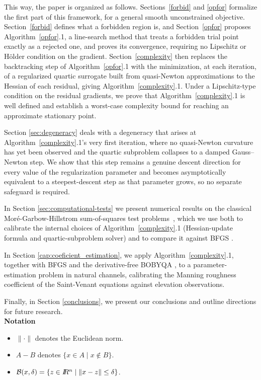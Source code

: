 \documentclass{article}
\newcommand{\R}         {I\!\!R}
\newcommand{\B}{{\cal B}}
\begin{document}
This way, the paper is organized as follows. Sections~\ref{forbid} and \ref{opfor} formalize the first part of this framework, for a general smooth unconstrained objective.
Section~\ref{forbid} defines what a forbidden region is, and Section~\ref{opfor} proposes Algorithm~\ref{opfor}.1, a line-search
method that treats a forbidden trial point exactly as a rejected one, and proves its convergence, requiring no Lipschitz or
H\"older condition on the gradient. Section~\ref{complexity} then replaces the backtracking step of Algorithm~\ref{opfor}.1 with
the minimization, at each iteration, of a regularized quartic surrogate built from quasi-Newton approximations to the Hessian of
each residual, giving Algorithm~\ref{complexity}.1. Under a Lipschitz-type condition on the residual gradients, we prove
that Algorithm~\ref{complexity}.1 is well defined and establish a worst-case complexity bound for reaching an approximate stationary point.

Section \ref{sec:degeneracy} deals with a degeneracy that arises at Algorithm~\ref{complexity}.1's very first iteration, where no quasi-Newton
 curvature has yet been observed and the quartic subproblem collapses to a damped Gauss--Newton step. We show that this step
remains a genuine descent direction for every value of the regularization parameter and becomes asymptotically equivalent to a
 steepest-descent step as that parameter grows, so no separate safeguard is required.

In Section \ref{sec:computational-tests} we present numerical results on the classical Mor\'e-Garbow-Hillstrom sum-of-squares
 test problems~\cite{MoreGarbowHillstrom1981}, which we use both to calibrate the internal choices of Algorithm~\ref{complexity}.1
 (Hessian-update formula and quartic-subproblem solver) and to compare it against BFGS \cite{NocedalWright2006, Powell1976}.

In Section \ref{cap:coeficient_estimation}, we apply Algorithm~\ref{complexity}.1, together with BFGS and the derivative-free BOBYQA \cite{bobyqa,rz}, to a
 parameter-estimation problem in natural channels, calibrating the Manning roughness coefficient of the Saint-Venant equations
 against elevation observations.

Finally, in Section \ref{conclusions}, we present our conclusions and outline directions for future research. \\

\noindent
{\bf Notation} 

\begin{itemize}

\item $\| \cdot \|$ denotes the Euclidean norm. 

\item $A - B$ denotes $\{x \in A \;|\; x \notin B\}$. 

\item $\B(x, \delta) = \{z \in \R^n \;|\; \|x - z\| \leq \delta\}$.

\end{itemize}
\end{document}

